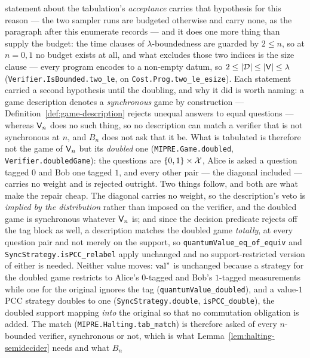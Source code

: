 \begin{remark}
\begin{enumerate}
  statement about the tabulation's \emph{acceptance} carries that hypothesis for this reason ---
  the two sampler runs are budgeted otherwise and carry none, as the paragraph after this
  enumerate records --- and it does one more thing than supply the budget: the time clauses of $\lambda$-boundedness are guarded by
  $2 \leq n$, so at $n = 0, 1$ no budget exists at all, and what excludes those two indices is
  the size clause --- every program encodes to a non-empty datum, so
  $2 \leq \left\vert {\mathcal{D}} \right\vert \leq \left\vert {\mathsf{V}} \right\vert \leq \lambda$
  (\texttt{Verifier.IsBounded.two\_le}, on \texttt{Cost.Prog.two\_le\_esize}). Each
  statement carried a second hypothesis until the doubling, and why it did is worth naming: a
  game description denotes a \emph{synchronous} game by construction ---
  Definition~\ref{def:game-description} rejects unequal answers to equal questions --- whereas
  $\mathsf{V}_n$ does no such thing, so no description can match a verifier that is not
  synchronous at $n$, and $B_n$ does not ask that it be. What is tabulated is therefore not
  the game of $\mathsf{V}_n$ but its \emph{doubled} one (\texttt{MIPRE.Game.doubled},
  \texttt{Verifier.doubledGame}): the questions are $\{0,1\} \times \mathcal{X}$, Alice is asked a
  question tagged $0$ and Bob one tagged $1$, and every other pair --- the diagonal included
  --- carries no weight and is rejected outright. Two things follow, and both are what make
  the repair cheap. The diagonal carries no weight, so the description's veto is
  \emph{implied by the distribution} rather than imposed on the verifier, and the doubled
  game is synchronous whatever $\mathsf{V}_n$ is; and since the decision predicate rejects off
  the tag block as well, a description matches the doubled game \emph{totally}, at every
  question pair and not merely on the support, so \texttt{quantumValue\_eq\_of\_equiv} and
  \texttt{SyncStrategy.isPCC\_relabel} apply unchanged and no support-restricted version of
  either is needed. Neither value moves: $\mathrm{val}^*$ is unchanged because a strategy for the
  doubled game restricts to Alice's $0$-tagged and Bob's $1$-tagged measurements while one
  for the original ignores the tag (\texttt{quantumValue\_doubled}), and a value-$1$ PCC
  strategy doubles to one (\texttt{SyncStrategy.double}, \texttt{isPCC\_double}), the doubled
  support mapping \emph{into} the original so that no commutation obligation is added. The
  match (\texttt{MIPRE.Halting.tab\_match}) is therefore asked of every $n$-bounded verifier,
  synchronous or not, which is what Lemma~\ref{lem:halting-semidecider} needs and what $B_n$

\end{enumerate}
\end{remark}
